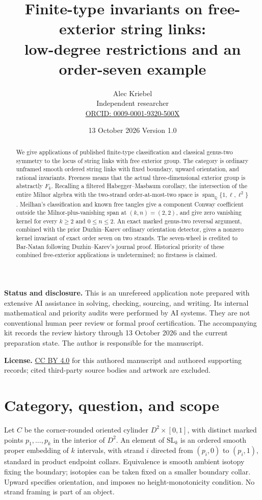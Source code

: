\documentclass[11pt]{article}
\title{Finite-type invariants on free-exterior string links:\\
low-degree restrictions and an order-seven example}
\author{Alec Kriebel\\Independent researcher\\
\small\href{https://orcid.org/0009-0001-9320-500X}{ORCID: 0009-0001-9320-500X}}
\date{13 October 2026 \quad Version 1.0}
\theoremstyle{remark}\newtheorem{remark}[theorem]{Remark}
\newcommand{\Q}{\mathbb Q}
\newcommand{\SL}{\mathrm{SL}}
\begin{document}
\maketitle
\begin{abstract}
We give applications of published finite-type classification and classical
genus-two symmetry to the locus of string links with free exterior group.
The category is ordinary unframed smooth ordered string links with fixed
boundary, upward orientation, and rational invariants. Freeness means that
the actual three-dimensional exterior group is abstractly $F_k$.
Recalling a filtered Habegger--Masbaum corollary, the intersection of the
entire Milnor algebra with the two-strand order-at-most-two space is
$\operatorname{span}_{\Q}\{1,\ell,\ell^2\}$.
Meilhan's classification and known free tangles give a component Conway
coefficient outside the Milnor-plus-vanishing span at $(k,n)=(2,2)$, and
give zero vanishing kernel for every $k\geq2$ and $0\leq n\leq2$.
An exact marked genus-two reversal argument, combined with the prior
Duzhin--Karev ordinary orientation detector, gives a nonzero kernel
invariant of exact order seven on two strands.
The seven-wheel is credited to Bar-Natan following Duzhin--Karev's journal
proof. Historical priority of these combined free-exterior applications
is undetermined; no firstness is claimed.
\end{abstract}
\noindent\textbf{Status and disclosure.}
This is an unrefereed application note prepared with extensive AI
assistance in solving, checking, sourcing, and writing. Its internal
mathematical and priority audits were performed by AI systems. They are
not conventional human peer review or formal proof certification.
The accompanying kit records the review history through 13 October 2026
and the current preparation state.
The author is responsible for the manuscript.
\smallskip

\noindent\textbf{License.} \href{https://creativecommons.org/licenses/by/4.0/}{CC BY 4.0}
for this authored manuscript and authored supporting records; cited
third-party source bodies and artwork are excluded.

\section{Category, question, and scope}
Let $C$ be the corner-rounded oriented cylinder $D^2\times[0,1]$, with
distinct marked points $p_1,\ldots,p_k$ in the interior of $D^2$.
An element of $\SL_k$ is an ordered smooth proper embedding of $k$ intervals,
with strand $i$ directed from $(p_i,0)$ to $(p_i,1)$, standard in product
endpoint collars. Equivalence is smooth ambient isotopy fixing the boundary;
isotopies can be taken fixed on a smaller boundary collar. Upward specifies
orientation, and imposes no height-monotonicity condition. No strand framing
is part of an object.
\end{document}
